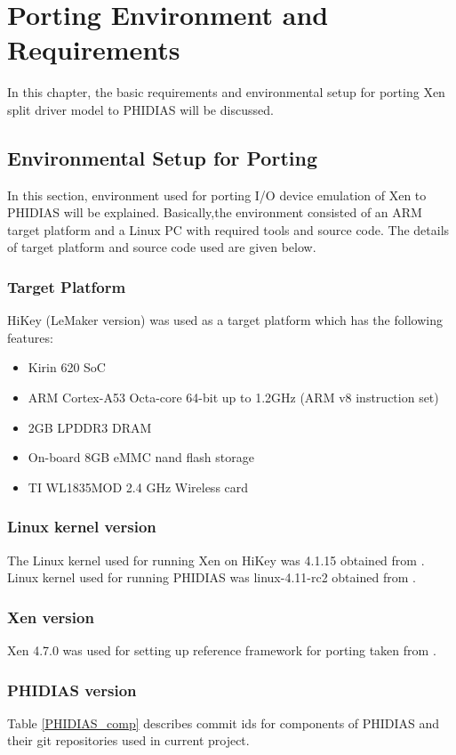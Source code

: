 \chapter{Porting Environment and Requirements\label{cha:chapter4}}
In this chapter, the basic requirements and environmental setup for porting Xen split driver model to PHIDIAS will be discussed. 

\section{Environmental Setup for Porting\label{sec:xen}}
In this section, environment used for porting I/O device emulation of Xen to PHIDIAS will be explained. Basically,the environment consisted of an ARM target platform and a Linux PC with required tools and source code. The details of target platform and source code used are given below.

\subsection{Target Platform\label{sec:xen}}
HiKey (LeMaker version) \cite{hikey} was used as a target platform which has the following features:
\begin{itemize}
	\item Kirin 620 SoC
	\item ARM Cortex-A53 Octa-core 64-bit up to 1.2GHz (ARM v8 instruction set)
	\item 2GB LPDDR3 DRAM
	\item On-board 8GB eMMC nand flash storage
	\item TI WL1835MOD 2.4 GHz Wireless card
\end{itemize}

\subsection{Linux kernel version\label{sec:xen}}
The Linux kernel used for running Xen on HiKey was 4.1.15 obtained from \cite{96boards_2016}. Linux kernel used for running PHIDIAS was linux-4.11-rc2 obtained from \cite{linux4_11}. 

\subsection{Xen version\label{sec:xen}}
Xen 4.7.0 was used for setting up reference framework for porting taken from \cite{xengit}.

\subsection{PHIDIAS version\label{sec:xen}}
Table \ref{PHIDIAS_comp} describes commit ids for components of PHIDIAS and their git repositories used in current project.

